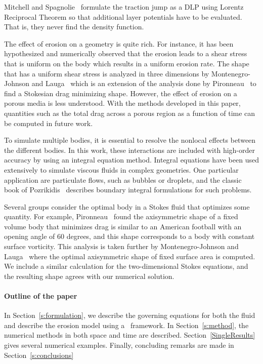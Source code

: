 \documentclass[preprint, 10pt]{elsarticle}
\begin{document}
Mitchell and Spagnolie~\cite{mit-spa2016} formulate the traction jump as
a DLP using Lorentz Reciprocal Theorem so that additional layer
potentials have to be evaluated.  That is, they never find the density
function.

The effect of erosion on a geometry is quite rich.  For instance, it has
been hypothesized and numerically observed that the erosion leads to a
shear stress that is uniform on the body which results in a uniform
erosion rate.  The shape that has a uniform shear stress is analyzed in
three dimensions by Montenegro-Johnson and Lauga~\cite{mon-lau2015}
which is an extension of the analysis done by Pironneau~\cite{pir1973}
to find a Stokesian drag minimizing shape.  However, the effect of
erosion on a porous media is less understood.  With the methods
developed in this paper, quantities such as the total drag across a
porous region as a function of time can be computed in future work.

To simulate multiple bodies, it is essential to resolve the nonlocal
effects between the different bodies.  In this work, these interactions
are included with high-order accuracy by using an integral equation
method.  Integral equations have been used extensively to simulate
viscous fluids in complex geometries.  One particular application are
particulate flows, such as bubbles or droplets, and the classic book of
Pozrikidis~\cite{poz1992} describes boundary integral formulations for
such problems.

Several groups consider the optimal body in a Stokes fluid that
optimizes some quantity.  For example, Pironneau~\cite{pir1973} found
the axisymmetric shape of a fixed volume body that minimizes drag is
similar to an American football with an opening angle of 60 degrees, and
this shape corresponds to a body with constant surface vorticity.  This
analysis is taken further by Montenegro-Johnson and
Lauga~\cite{mon-lau2015} where the optimal axisymmetric shape of fixed
surface area is computed.  We include a similar calculation for the
two-dimensional Stokes equations, and the resulting shape agrees with
our numerical solution. 



\paragraph{Outline of the paper} In Section~\ref{s:formulation}, we
describe the governing equations for both the fluid and describe the
erosion model using a \thL~framework.  In Section~\ref{s:method}, the
numerical methods in both space and time are described.
Section~\ref{SingleResults} gives several numerical examples.  Finally,
concluding remarks are made in Section~\ref{s:conclusions}
\end{document}
